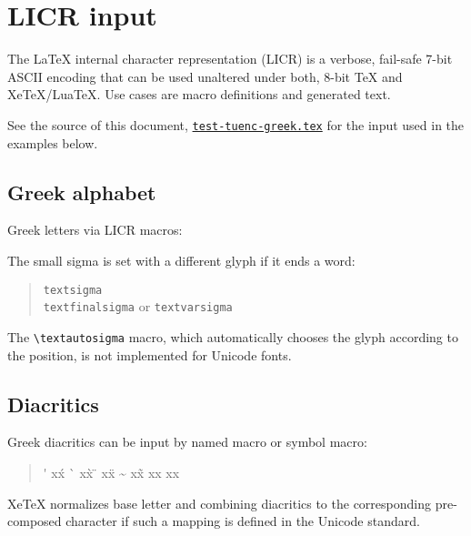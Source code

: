 \documentclass[a4paper]{article}
\begin{document}
\section{LICR input%
         \label{licr}}

The LaTeX internal character representation (LICR) is a verbose,
fail-safe 7-bit ASCII encoding that can be used unaltered under both, 8-bit
TeX and XeTeX/LuaTeX. Use cases are macro definitions and generated text.

See the source of this document,
\href{test-tuenc-greek.tex}{\texttt{test-tuenc-greek.tex}} for the input used
in the examples below.

\subsection{Greek alphabet}

Greek letters via LICR macros:
\begin{quote}
  \textAlpha{} \textBeta{} \textGamma{} \textDelta{} \textEpsilon{}
  \textZeta{} \textEta{} \textTheta{} \textIota{} \textKappa{}
  \textLambda{} \textMu{} \textNu{} \textXi{} \textOmicron{} \textPi{}
  \textRho{} \textSigma{} \textTau{} \textUpsilon{} \textPhi{}
  \textChi{} \textPsi{} \textOmega{}

  \textalpha{} \textbeta{} \textgamma{} \textdelta{} \textepsilon{}
  \textzeta{} \texteta{} \texttheta{} \textiota{} \textkappa{}
  \textlambda{} \textmu{} \textnu{} \textxi{} \textomicron{} \textpi{}
  \textrho{} \textsigma{} \texttau{} \textupsilon{}
  \textphi{} \textchi{} \textpsi{} \textomega{}
\end{quote}
The small sigma is set with a different
glyph if it ends a word:
\begin{quote}
  \textsigma{}       \verb|textsigma|\\
  \textfinalsigma{}  \verb|textfinalsigma| or \verb|textvarsigma|
\end{quote}
The \verb|\textautosigma| macro, which automatically chooses the
glyph according to the position, is not implemented for Unicode fonts.

\subsection{Diacritics}

Greek diacritics can be input by named macro or symbol macro:
\begin{quote}
  \acctonos\textalpha       \'\textalpha{}  \acctonos       x\'x
  \accvaria\textalpha       \`\textalpha{}  \accvaria       x\`x
  \accdialytika\textiota    \"\textiota{}   \accdialytika   x\"x
  \accperispomeni\textalpha \~\textalpha{}  \accperispomeni x\~x
  \accpsili\textalpha       \>\textalpha{}  \accpsili       x\>x
  \accdasia\textalpha       \<\textalpha{}  \accdasia       x\<x
\end{quote}
%
XeTeX normalizes base letter and combining diacritics to the
corresponding pre-composed character if such a mapping is defined in the
Unicode standard.
\end{document}
